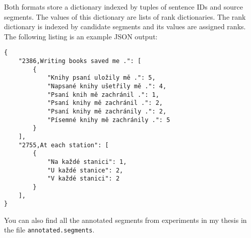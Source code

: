 \noindent Both formats store a dictionary indexed by tuples of sentence IDs and
source segments. The values of this dictionary are lists of rank dictionaries.
The rank dictionary is indexed by candidate segments and its values are
assigned ranks. The following listing is an example JSON output:

\begin{verbatim}
{
    "2386,Writing books saved me .": [
        {
            "Knihy psaní uložily mě .": 5,
            "Napsané knihy ušetřily mě .": 4,
            "Psaní knih mě zachránil .": 1,
            "Psaní knihy mě zachránil .": 2,
            "Psaní knihy mě zachránily .": 2,
            "Písemné knihy mě zachránily .": 5
        }
    ],
    "2755,At each station": [
        {
            "Na každé stanici": 1,
            "U každé stanice": 2,
            "V každé stanici": 2
        }
    ],
}
\end{verbatim}

\noindent
You can also find all the annotated segments from experiments in my thesis in
the file \texttt{annotated.segments}.
